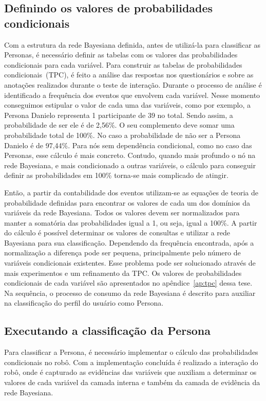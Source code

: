 \subsection{Definindo os valores de probabilidades condicionais}
\label{sec:tpc}
Com a estrutura da rede Bayesiana definida, antes de utilizá-la para classificar as Personas, é necessário definir as tabelas com os valores das probabilidades condicionais para cada variável. Para construir as tabelas de probabilidades condicionais~(TPC), é feito a análise das respostas nos questionários e sobre as anotações realizados durante o teste de interação. Durante o processo de análise é identificado a frequência dos eventos que envolvem cada variável. Nesse momento conseguimos estipular o valor de cada uma das variáveis, como por exemplo, a Persona Danielo representa 1 participante de 39 no total. Sendo assim, a probabilidade de ser ele é de 2,56\%. O seu complemento deve somar uma probabilidade total de 100\%. No caso a probabilidade de não ser a Persona Danielo é de 97,44\%. Para nós sem dependência condicional, como no caso das Personas, esse cálculo é mais concreto. Contudo, quando mais profundo o nó na rede Bayesiana, e mais condicionado a outras variáveis, o cálculo para conseguir definir as probabilidades em 100\% torna-se mais complicado de atingir.

 Então, a partir da contabilidade dos eventos utilizam-se as equações de teoria de probabilidade definidas para encontrar os valores de cada um dos domínios da variáveis da rede Bayesiana. Todos os valores devem ser normalizados para manter a somatória das probabilidades igual a 1, ou seja, igual a 100\%. A partir do cálculo é possível determinar os valores de consultas e utilizar a rede Bayesiana para sua classificação. Dependendo da frequência encontrada, após a normalização a diferença pode ser pequena, principalmente pelo número de variáveis condicionais existentes. Esse problema pode ser solucionado através de mais experimentos e um refinamento da TPC. Os valores de probabilidades condicionais de cada variável são apresentados no apêndice~\ref{ap:tpc} dessa tese. Na sequência, o processo de consumo da rede Bayesiana é descrito para auxiliar na classificação do perfil do usuário como Persona.

\subsection{Executando a classificação da Persona}
\label{sec:consumo}
Para classificar a Persona, é necessário implementar o cálculo das probabilidades condicionais no robô. Com a implementação concluída é realizado a interação do robô, onde é capturado as evidências das variáveis que auxiliam a determinar os valores de cada variável da camada interna e também da camada de evidência da rede Bayesiana.


